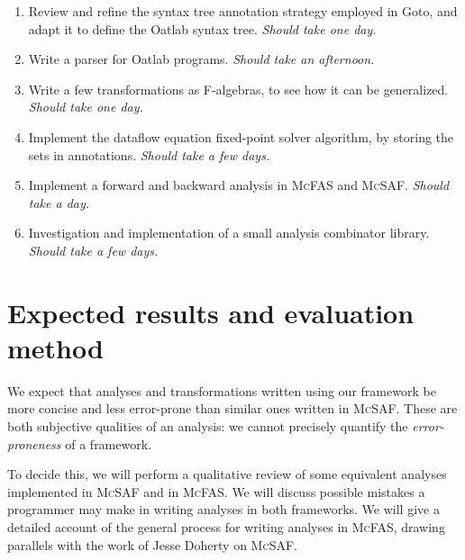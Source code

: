\documentclass[letterpaper,11pt]{article}
\newcommand{\mcfas}{\textsc{McFAS}}
\newcommand{\mcsaf}{\textsc{McSAF}}
\begin{document}
\begin{enumerate}
  \item Review and refine the syntax tree annotation strategy employed in
    Goto\cite{Goto}, and adapt it to define the Oatlab syntax tree.
    \emph{Should take one day.}
  \item Write a parser for Oatlab programs. \emph{Should take an afternoon.}
  \item Write a few transformations as F-algebras, to see how it can be
    generalized. \emph{Should take one day.}
  \item Implement the dataflow equation fixed-point solver algorithm, by
    storing the sets in annotations. \emph{Should take a few days.}
  \item Implement a forward and backward analysis in \mcfas{} and \mcsaf{}.
    \emph{Should take a day.}
  \item Investigation and implementation of a small analysis combinator
    library. \emph{Should take a few days.}
\end{enumerate}

\section{Expected results and evaluation method}

We expect that analyses and transformations written using our framework be more
concise and less error-prone than similar ones written in \mcsaf{}. These are
both subjective qualities of an analysis: we cannot precisely quantify the
\emph{error-proneness} of a framework.

To decide this, we will perform a qualitative review of some equivalent
analyses implemented in \mcsaf{} and in \mcfas{}. We will discuss possible
mistakes a programmer may make in writing analyses in both frameworks. We will
give a detailed account of the general process for writing analyses in
\mcfas{}, drawing parallels with the work of Jesse Doherty on \mcsaf{}\cite{McSAF}.



\end{document}

